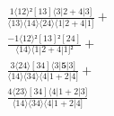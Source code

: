 \documentclass[varwidth, border=5pt]{standalone}
\begin{document}
\begin{my}
$\begin{gathered}
\scriptscriptstyle\frac{1⟨12⟩²[13]⟨3|2+4|3]}{⟨13⟩⟨14⟩⟨24⟩⟨1|2+4|1]} +\\
\scriptscriptstyle\frac{-1⟨12⟩²[13]²[24]}{⟨14⟩⟨1|2+4|1]²} +\\
\scriptscriptstyle\frac{3⟨24⟩[34]⟨3|𝟓|3]}{⟨14⟩⟨34⟩⟨4|1+2|4]} +\\
\scriptscriptstyle\frac{4⟨23⟩[34]⟨4|1+2|3]}{⟨14⟩⟨34⟩⟨4|1+2|4]} \phantom{+}
\end{gathered}$
\end{my}
\end{document}
